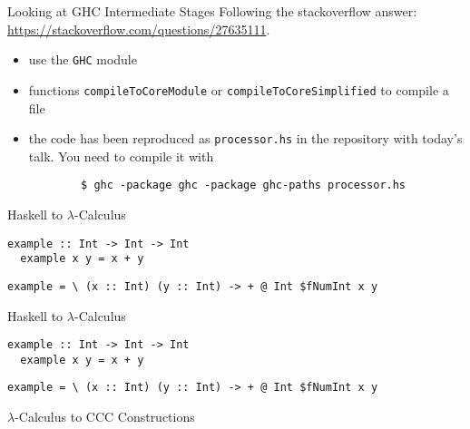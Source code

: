\documentclass[10pt]{beamer}
\theoremstyle{definition}
\theoremstyle{remark}
\numberwithin{equation}{section}
\begin{document}
\begin{frame}[fragile]{Looking at GHC Intermediate Stages}
  Following the stackoverflow answer: \url{https://stackoverflow.com/questions/27635111}.
  \begin{itemize}
    \item use the \lstinline{GHC} module
    \item functions \lstinline{compileToCoreModule} or \lstinline{compileToCoreSimplified} to compile a file
    \item the code has been reproduced as \lstinline{processor.hs} in the repository with today's talk. You need to compile it with
      \begin{lstlisting}
        $ ghc -package ghc -package ghc-paths processor.hs
      \end{lstlisting}
  \end{itemize}
\end{frame}

\begin{frame}[fragile]{Haskell to $\lambda$-Calculus}
  \begin{lstlisting}[frame=single]
  example :: Int -> Int -> Int
  example x y = x + y
  \end{lstlisting}

  \begin{lstlisting}[frame=single]
  example = \ (x :: Int) (y :: Int) -> + @ Int $fNumInt x y
  \end{lstlisting}
\end{frame}

\begin{frame}[fragile]{Haskell to $\lambda$-Calculus}
  \begin{lstlisting}[frame=single]
  example :: Int -> Int -> Int
  example x y = x + y
  \end{lstlisting}

  \begin{lstlisting}[frame=single]
  example = \ (x :: Int) (y :: Int) -> + @ Int $fNumInt x y
  \end{lstlisting}
\end{frame}

\begin{frame}[fragile]{$\lambda$-Calculus to CCC Constructions}
\end{frame}

\begin{frame}[fragile]{}
\end{frame}

\begin{frame}[fragile]{}
\end{frame}
\end{document}
